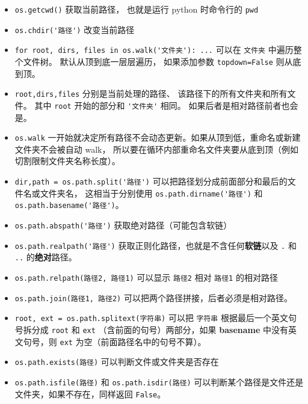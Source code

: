 
\begin{issues}
\issueDraft
\end{issues}

\begin{itemize}
\item \verb`os.getcwd()` 获取当前路径， 也就是运行 python 时命令行的 \verb`pwd`
\item \verb`os.chdir('路径')` 改变当前路径 
\item \verb`for root, dirs, files in os.walk('文件夹'): ...` 可以在 \verb`文件夹` 中遍历整个文件树。 默认从顶到底一层层遍历， 如果添加参数 \verb`topdown=False` 则从底到顶。
\item \verb`root,dirs,files` 分别是当前处理的路径、 该路径下的所有文件夹和所有文件。 其中 \verb`root` 开始的部分和 \verb`'文件夹'` 相同。 如果后者是相对路径前者也会是。
\item \verb`os.walk` 一开始就决定所有路径不会动态更新。如果从顶到低，重命名或新建文件夹不会被自动 walk， 所以要在循环内部重命名文件夹要从底到顶（例如切割限制文件夹名称长度）。
\item \verb`dir,path = os.path.split('路径')` 可以把路径划分成前面部分和最后的文件名或文件夹名， 这相当于分别使用 \verb`os.path.dirname('路径')` 和 \verb`os.path.basename('路径')`。
\item \verb`os.path.abspath('路径')` 获取绝对路径（可能包含软链）
\item \verb`os.path.realpath('路径')` 获取正则化路径，也就是不含任何\textbf{软链}以及 \verb`.` 和 \verb`..` 的\textbf{绝对}路径。
\item \verb`os.path.relpath(路径2, 路径1)` 可以显示 \verb`路径2` 相对 \verb`路径1` 的相对路径
\item \verb`os.path.join(路径1, 路径2)` 可以把两个路径拼接，后者必须是相对路径。
\item \verb`root, ext = os.path.splitext(字符串)` 可以把 \verb`字符串` 根据最后一个英文句号拆分成 \verb`root` 和 \verb`ext` （含前面的句号）两部分，如果 \textbf{basename} 中没有英文句号，则 \verb`ext` 为空（前面路径名中的句号不算）。
\item \verb`os.path.exists(路径)` 可以判断文件或文件夹是否存在
\item \verb`os.path.isfile(路径)` 和 \verb`os.path.isdir(路径)` 可以判断某个路径是文件还是文件夹，如果不存在，同样返回 \verb`False`。
\end{itemize}
